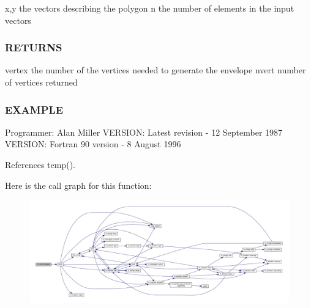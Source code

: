x,y the vectors describing the polygon n the number of elements in the input vectors

\subsubsection*{R\+E\+T\+U\+R\+NS}

vertex the number of the vertices needed to generate the envelope nvert number of vertices returned

\subsubsection*{E\+X\+A\+M\+P\+LE}

Programmer\+: Alan Miller V\+E\+R\+S\+I\+ON\+: Latest revision -\/ 12 September 1987 V\+E\+R\+S\+I\+ON\+: Fortran 90 version -\/ 8 August 1996 

References temp().

Here is the call graph for this function\+:
\nopagebreak
\begin{figure}[H]
\begin{center}
\leavevmode
\includegraphics[width=350pt]{namespacem__math_aec13601dba0398f78ad7b25d964f40a6_cgraph}
\end{center}
\end{figure}
\mbox{\label{namespacem__math_a70e89987b4dfc6f42864fb9c6907b5b1}} 
